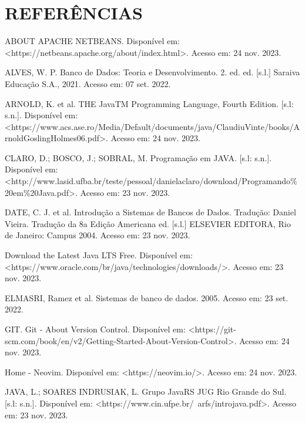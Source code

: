 \documentclass[a4paper,12pt]{article}
\begin{document}
\pagebreak
\centering \section*{REFERÊNCIAS}
\vspace{1cm}

\raggedright
\noindent ABOUT APACHE NETBEANS. Disponível em: <https://netbeans.apache.org/about/index.html>. Acesso em: 24 nov. 2023. \linebreak

\noindent ALVES, W. P. Banco de Dados: Teoria e Desenvolvimento. 2. ed. ed. [s.l.] Saraiva Educação S.A., 2021. Acesso em: 07 set. 2022. \linebreak 

\noindent ARNOLD, K. et al. THE JavaTM Programming Language, Fourth Edition. [s.l: s.n.]. 
Disponível em: <https://www.acs.ase.ro/Media/Default/documents/java/ClaudiuVinte/books/ArnoldGoslingHolmes06.pdf>. 
Acesso em: 24 nov. 2023. \linebreak

\noindent CLARO, D.; BOSCO, J.; SOBRAL, M. Programação em JAVA. [s.l: s.n.]. 
Disponível em: <http://www.lasid.ufba.br/teste/pessoal/danielaclaro/download/Programando\%20em\%20Java.pdf>. 
Acesso em: 23 nov. 2023. \linebreak

\noindent DATE, C. J. et al. Introdução a Sistemas de Bancos de Dados. Tradução: Daniel Vieira. Tradução da 8a Edição Americana ed. [s.l.] 
ELSEVIER EDITORA, Rio de Janeiro: Campus 2004. Acesso em: 23 nov. 2023. \linebreak

\noindent Download the Latest Java LTS Free. Disponível em: <https://www.oracle.com/br/java/technologies/downloads/>. 
Acesso em: 23 nov. 2023. \linebreak

\noindent ELMASRI, Ramez et al. Sistemas de banco de dados. 2005. Acesso em: 23 set. 2022. \linebreak

\noindent GIT. Git - About Version Control. Disponível em: <https://git-scm.com/book/en/v2/Getting-Started-About-Version-Control>.
‌Acesso em: 24 nov. 2023. \linebreak

\noindent Home - Neovim. Disponível em: <https://neovim.io/>. Acesso em: 24 nov. 2023. \linebreak

\noindent JAVA, L.; SOARES INDRUSIAK, L. Grupo JavaRS JUG Rio Grande do Sul. [s.l: s.n.]. 
Disponível em: <https://www.cin.ufpe.br/~arfs/introjava.pdf>. Acesso em: 23 nov. 2023. \linebreak
\end{document}
